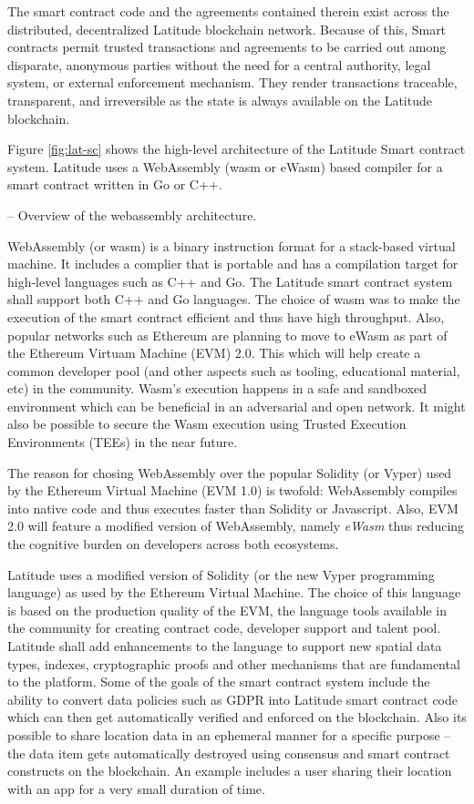 The smart contract code and the agreements contained therein exist across the distributed, decentralized Latitude
blockchain network.  Because of this, Smart contracts permit trusted transactions and agreements to be carried out among
disparate, anonymous parties without the need for a central authority, legal system, or external enforcement mechanism.
They render transactions traceable, transparent, and irreversible as the state is always available on the Latitude
blockchain.

Figure \ref{fig:lat-sc} shows the high-level architecture of the Latitude Smart contract system. Latitude uses a
WebAssembly (wasm or eWasm) based compiler for a smart contract written in Go or C++. 

-- Overview of the webassembly architecture.

WebAssembly (or wasm) is a binary instruction format for a stack-based virtual machine. It includes a complier that is
portable and has a compilation target for high-level languages such as C++ and Go. The Latitude smart contract system
shall support both C++ and Go languages. The choice of wasm was to make the execution of the smart contract efficient
and thus have high throughput. Also, popular networks such as Ethereum are planning to move to eWasm as part of the
Ethereum Virtuam Machine (EVM) 2.0. This which will help create a common developer pool (and other aspects such as
tooling, educational material, etc) in the community. Wasm's execution happens in a safe and sandboxed
environment which can be beneficial in an adversarial and open network. It might also be possible to secure the Wasm
execution using Trusted Execution Environments (TEEs) in the near future.

The reason for chosing WebAssembly over the popular Solidity (or Vyper) used by the Ethereum Virtual Machine (EVM 1.0)
is twofold: 
WebAssembly compiles into native code and thus executes faster than Solidity or Javascript. Also, EVM 2.0 will feature
a modified version of WebAssembly, namely {\it eWasm} thus reducing the cognitive burden on developers across both
ecosystems.

Latitude uses a
modified version of Solidity (or the new Vyper programming language) as used by the Ethereum Virtual Machine. The choice
of this language is based on the production quality of the EVM, the language tools available in the community for
creating contract code, developer support and talent pool. Latitude shall add enhancements to the language to support
new spatial data types, indexes, cryptographic proofs and other mechanisms that are fundamental to the platform. Some of
the goals of the smart contract system include the ability to convert data policies such as GDPR \cite{gdpr} into
Latitude smart contract code which can then get automatically verified and enforced on the blockchain.  Also its
possible to share location data in an ephemeral manner for a specific purpose -- the data item gets automatically
destroyed using consensus and smart contract constructs on the blockchain. An example includes a user sharing their
location with an app for a very small duration of time.

